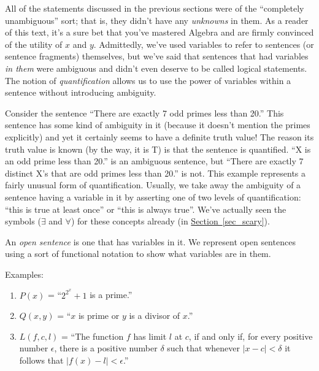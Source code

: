 \documentclass[10pt,]{book}
\theoremstyle{plain}
\theoremstyle{definition}
\theoremstyle{definition}
\numberwithin{equation}{section}
\newcommand{\lt}{ < }
\begin{document}
    All of the statements discussed in the previous sections were of the
    ``completely unambiguous'' sort; that is, they didn't have any \emph{unknowns}
    in them. As a reader of this text, it's a sure bet that you've mastered
    Algebra and are firmly convinced of the utility of \(x\) and \(y\). Admittedly,
    we've used variables to refer to sentences (or sentence fragments) themselves,
    but we've said that sentences that had variables \emph{in them} were ambiguous
    and didn't even deserve to be called logical statements. The notion
    of \emph{quantification}
    allows us to use the power of variables within a
    sentence without introducing ambiguity.
\par

    Consider the sentence ``There are exactly 7 odd primes less than 20.''
    This sentence has some kind of ambiguity in it (because it doesn't mention
    the primes explicitly) and yet it certainly seems to have a definite
    truth value! The reason its truth value is known (by the way, it is T)
    is that the sentence is quantified. ``X is an odd prime less than 20.''
    is an ambiguous sentence, but ``There are exactly 7 distinct X's that
    are odd primes less than 20.'' is not. This example represents a fairly
    unusual form of quantification. Usually, we take away the ambiguity
    of a sentence having a variable in it by asserting one of two levels
    of quantification: ``this is true at least once'' or ``this is always true''.
    We've actually seen the symbols (\(\exists\) and \(\forall\)) for these
    concepts already (in \hyperref[sec_scary]{Section~\ref{sec_scary}}).
\par

    An \emph{open sentence}
    is one that has variables in it. We represent
    open sentences using a sort of functional notation to show what
    variables are in them.
\par

  Examples:

  \leavevmode%
\begin{enumerate}
\item\hypertarget{li-174}{}
        \(P(x)\) = ``\(2^{2^x}+1\) is a prime.''
\item\hypertarget{li-175}{}
        \(Q(x,y)\) = ``\(x\) is prime or \(y\) is a divisor of \(x\).''
\item\hypertarget{li-176}{}
        \(L(f,c,l)\) = ``The function \(f\) has limit \(l\) at \(c\), if 
        and only if, 
        for every positive number \(\epsilon\), there is a positive number \(\delta\) 
        such that whenever \(|x-c| \lt  \delta\) it follows that \(|f(x)-l| \lt  \epsilon\).''
\end{enumerate}
\end{document}
